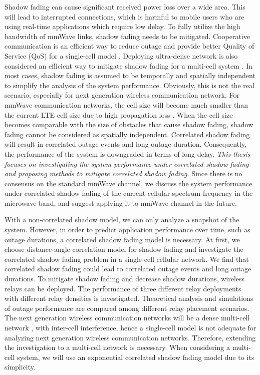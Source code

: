 \par Shadow fading can cause significant received power loss over a wide area. This will lead to interrupted connections, which is harmful to mobile users who are using real-time applications which require low delay. To fully utilize the high bandwidth of mmWave links, shadow fading needs to be mitigated. Cooperative communication is an efficient way to reduce outage and provide better Quality of Service (QoS) for a single-cell model \cite{chang2009performance, lee2009performance}. Deploying ultra-dense network is also considered an efficient way to mitigate shadow fading for a multi-cell system \cite{gotsis2016ultradense, ghosh2014millimeter}. In most cases, shadow fading is assumed to be temporally and spatially independent to simplify the analysis of the system performance. Obviously, this is not the real scenario, especially for next generation wireless communication network. For mmWave communication networks, the cell size will become much smaller than the current LTE cell size due to high propagation loss \cite{rangan2014millimeter}. When the cell size becomes comparable with the size of obstacles that cause shadow fading, shadow fading cannot be considered as spatially independent. Correlated shadow fading will result in correlated outage events and long outage duration. Consequently, the performance of the system is downgraded in terms of long delay. \textit{This thesis focuses on investigating the system performance under correlated shadow fading and proposing methods to mitigate correlated shadow fading. }Since there is no consensus on the standard mmWave channel, we discuss the system performance under correlated shadow fading of the current cellular spectrum frequency in the microwave band, and suggest applying it to mmWave channel in the future. 

\par With a non-correlated shadow model, we can only analyze a snapshot of the system. However, in order to predict application performance over time, such as outage durations, a correlated shadow fading model is necessary. At first, we choose distance-angle correlation model \cite{szyszkowicz2010feasibility} for shadow fading and investigate the correlated shadow fading problem in a single-cell cellular network. We find that correlated shadow fading could lead to correlated outage events and long outage durations.  To mitigate shadow fading and decrease shadow durations, wireless relays can be deployed. The performance of three different relay deployments with different relay densities is investigated. Theoretical analysis and simulations of outage performance are compared among different relay placement scenarios. The next generation wireless communication networks will be a dense multi-cell network \cite{rangan2014millimeter}, with inter-cell interference, hence a single-cell model is not adequate for analyzing next generation wireless communication networks. Therefore, extending the investigation to a multi-cell network is necessary. When considering a multi-cell system, we will use an exponential correlated shadow fading model due to its simplicity. 

